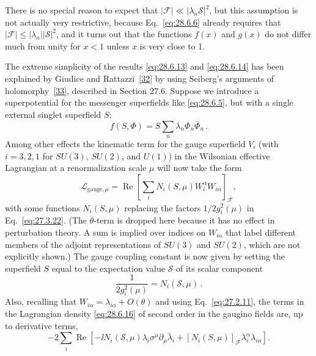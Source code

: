 There is no special reason to expect that
\(\lvert\mathcal{F}\rvert\ll
\lvert\lambda_n\mathcal{S}\rvert^2\), but this assumption is not actually
very restrictive, because Eq.~\eqref{eq:28.6.6} already requires that
\(\lvert\mathcal{F}\rvert\leq
\lvert\lambda_n\rvert\lvert\mathcal{S}\rvert^2\), and it turns out that
the functions \(f(x)\) and \(g(x)\) do not differ much from unity for
\(x<1\) unless \(x\) is very close to 1.

The extreme simplicity of the results \eqref{eq:28.6.13} and
\eqref{eq:28.6.14} has been explained by Giudice and
Rattazzi~\hyperref[ch28-ref-32]{[32]} by using Seiberg's arguments of
holomorphy~\hyperref[ch28-ref-33]{[33]}, described in Section 27.6.
Suppose we introduce a superpotential for the messenger superfields like
\eqref{eq:28.6.5}, but with a single external singlet superfield \(S\):
\begin{equation}
  f(S,\Phi)=S\sum_n\lambda_n\Phi_n\bar\Phi_n\,.
  \tag{28.6.15}\label{eq:28.6.15}
\end{equation}
Among other effects the kinematic term for the gauge superfield \(V_i\)
(with \(i=3,2,1\) for \(SU(3)\), \(SU(2)\), and \(U(1)\)) in the
Wilsonian effective Lagrangian at a renormalization scale \(\mu\) will now
take the form
\begin{equation}
  \mathcal{L}_{\mathrm{gauge},\mu}
  =\operatorname{Re}
  \left[
    \sum_iN_i(S,\mu)
      W_i^\alpha W_{i\alpha}
  \right]_{\mathcal{F}},
  \tag{28.6.16}\label{eq:28.6.16}
\end{equation}
with some functions \(N_i(S,\mu)\) replacing the factors
\(1/2g_i^2(\mu)\) in Eq.~\eqref{eq:27.3.22}. (The \(\theta\)-term is
dropped here because it has no effect in perturbation theory. A sum is
implied over indices on \(W_{i\alpha}\) that label different members of
the adjoint representations of \(SU(3)\) and \(SU(2)\), which are not
explicitly shown.) The gauge coupling constant is now given by setting the
superfield \(S\) equal to the expectation value \(\mathcal{S}\) of its
scalar component
\begin{equation}
  \frac{1}{2g_i^2(\mu)}=N_i(\mathcal{S},\mu)\,.
  \tag{28.6.17}\label{eq:28.6.17}
\end{equation}
Also, recalling that \(W_{i\alpha}=\lambda_{i\alpha}+O(\theta)\) and
using Eq.~\eqref{eq:27.2.11}, the terms in the Lagrangian density
\eqref{eq:28.6.16} of second order in the gaugino fields are, up to
derivative terms,
\[
  -2\sum_i\operatorname{Re}
  \left[
    -\ii N_i(\mathcal{S},\mu)
      \lambda_i\sigma^\mu\partial_\mu\bar\lambda_i
    +[N_i(S,\mu)]_{\mathcal{F}}
      \lambda_i^\alpha\lambda_{i\alpha}
  \right].
\]
